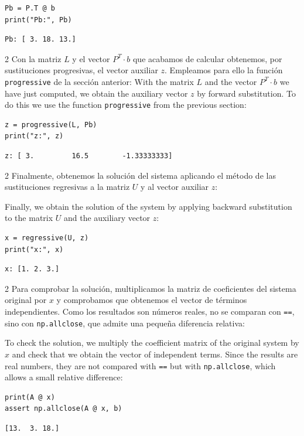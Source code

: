 \begin{verbatim}
Pb = P.T @ b
print("Pb:", Pb)
\end{verbatim}
\begin{verbatim}
Pb: [ 3. 18. 13.]
\end{verbatim}

\begin{paracol}{2}
Con la matriz $L$ y el vector $P^T\cdot b$ que acabamos de calcular obtenemos, por sustituciones progresivas, el vector auxiliar $z$. Empleamos para ello la función \texttt{progressive} de la sección anterior:
\switchcolumn
With the matrix $L$ and the vector $P^T\cdot b$ we have just computed, we obtain the auxiliary vector $z$ by forward substitution. To do this we use the function \texttt{progressive} from the previous section:
\end{paracol}

\begin{verbatim}
z = progressive(L, Pb)
print("z:", z)
\end{verbatim}
\begin{verbatim}
z: [ 3.         16.5        -1.33333333]
\end{verbatim}

\begin{paracol}{2}
Finalmente, obtenemos la solución del sistema aplicando el método de las sustituciones regresivas a la matriz $U$ y al vector auxiliar $z$:

\switchcolumn
Finally, we obtain the solution of the system by applying backward substitution to the matrix $U$ and the auxiliary vector $z$:
\end{paracol}

\begin{verbatim}
x = regressive(U, z)
print("x:", x)
\end{verbatim}
\begin{verbatim}
x: [1. 2. 3.]
\end{verbatim}

\begin{paracol}{2}
Para comprobar la solución, multiplicamos la matriz de coeficientes del sistema original por $x$ y comprobamos que obtenemos el vector de términos independientes. Como los resultados son números reales, no se comparan con \texttt{==}, sino con \texttt{np.allclose}, que admite una pequeña diferencia relativa:

\switchcolumn

To check the solution, we multiply the coefficient matrix of the original system by $x$ and check that we obtain the vector of independent terms. Since the results are real numbers, they are not compared with \texttt{==} but with \texttt{np.allclose}, which allows a small relative difference:
\end{paracol}
\begin{verbatim}
print(A @ x)
assert np.allclose(A @ x, b)
\end{verbatim}
\begin{verbatim}
[13.  3. 18.]
\end{verbatim}


